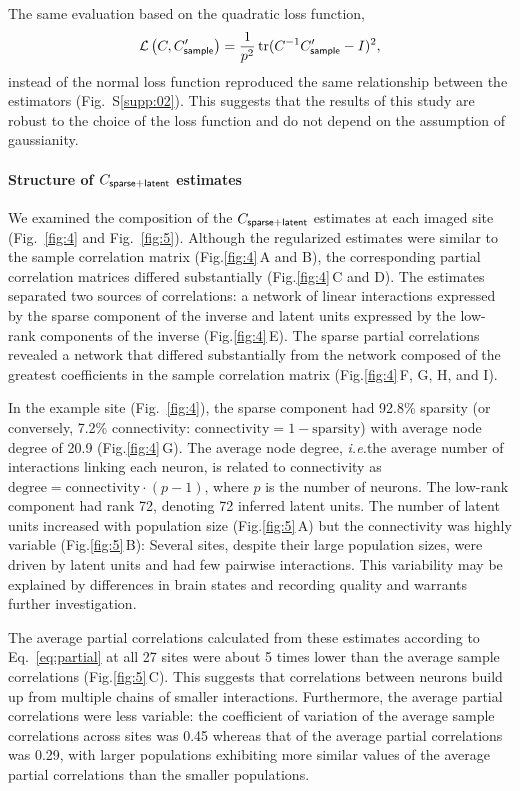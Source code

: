 \documentclass[10pt]{article}
\DeclareMathOperator{\Tr}{tr}
\newcommand{\figref}[2]{Fig.\;\ref{fig:#1}\,#2}
\newcommand{\loss}[1]{\mathcal L\left(#1\right)}
\newcommand{\ie}{\emph{i.e.}\;}
\begin{document}
The same evaluation based on the quadratic loss function,
\begin{equation}\label{eq:quad}
\loss{C,C_{\sf sample}^\prime}=\frac 1 {p^2}\Tr(C^{-1}C_{\sf sample}^\prime-I)^2,
\end{equation}
instead of the normal loss function reproduced the same relationship between the estimators (Fig.~S\ref{supp:02}). This suggests that the results of this study are robust to the choice of the loss function and do not depend on the assumption of gaussianity. 

\paragraph{Structure of $C_{\sf sparse+latent}$ estimates}
We examined the composition of the $C_{\sf sparse+latent}$ estimates at each imaged site (Fig.~\ref{fig:4} and Fig.~\ref{fig:5}). Although the regularized estimates were similar to the sample correlation matrix (\figref{4}{A and B}), the corresponding partial correlation matrices differed substantially (\figref{4}{C and D}). The estimates separated two sources of correlations: a network of linear interactions expressed by the sparse component of the inverse and latent units expressed by the low-rank components of the inverse (\figref{4}E). The sparse partial correlations revealed a network that differed substantially from the network composed of the greatest coefficients in the sample correlation matrix (\figref{4}{F, G, H, and I}).

In the example site (Fig.~\ref{fig:4}), the sparse component had 92.8\% sparsity (or conversely, 7.2\% connectivity: $\mbox{connectivity}=1-\mbox{sparsity}$) with average node degree of 20.9 (\figref{4}{G}). The average node degree, \ie the average number of interactions linking each neuron, is related to connectivity as $\mbox{degree} = \mbox{connectivity}\cdot(p-1)$, where $p$ is the number of neurons. The low-rank component had rank 72, denoting 72 inferred latent units. The number of latent units increased with population size (\figref{5}{A}) but the connectivity was highly variable (\figref{5}{B}): Several sites, despite their large population sizes, were driven by latent units and had few pairwise interactions. This variability may be explained by differences in brain states and recording quality and warrants further investigation.

The average partial correlations calculated from these estimates according to Eq.~\ref{eq:partial} at all 27 sites were about 5 times lower than the average sample correlations (\figref{5}{C}). This suggests that correlations between neurons build up from multiple chains of smaller interactions. Furthermore, the average partial correlations were less variable: the coefficient of variation of the average sample correlations across sites was 0.45 whereas that of the average partial correlations was 0.29, with larger populations exhibiting more similar values of the average partial correlations than the smaller populations. 
\end{document}
